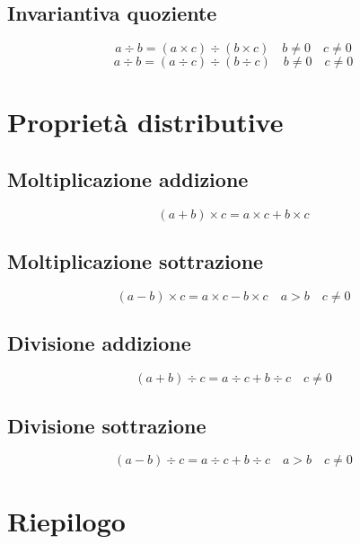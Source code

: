 \subsection{Invariantiva quoziente}
\begin{equation}
a\div b=(a\times c)\div (b\times c)\quad b\neq 0\quad c \neq 0
\end{equation}
\begin{equation}
a\div b=(a\div c)\div (b\div c)\quad b\neq 0\quad c \neq 0
\end{equation}
\section{Proprietà distributive}
\subsection{Moltiplicazione addizione}
\begin{equation}
(a+b)\times c=a\times c+b\times c
\end{equation}
\subsection{Moltiplicazione sottrazione}
\begin{equation}
(a-b)\times c=a\times c-b\times c\quad a>b\quad c\neq 0
\end{equation}
\subsection{Divisione addizione}
\begin{equation}
(a+b)\div c=a\div c+b\div c\quad c\neq 0
\end{equation}
\subsection{Divisione sottrazione}
\begin{equation}
(a-b)\div c=a\div c+b\div c\quad a>b\quad c\neq 0
\end{equation}
\section{Riepilogo}

